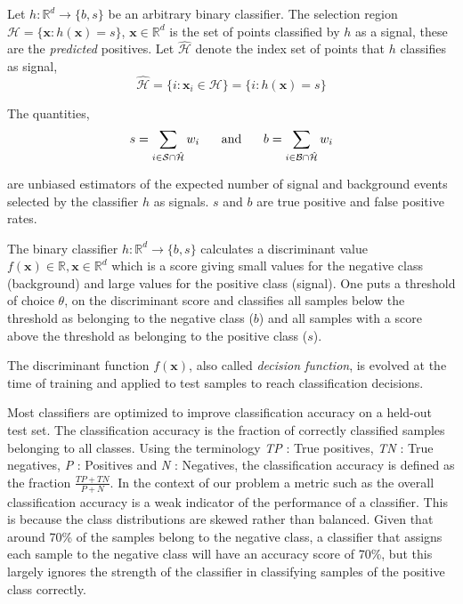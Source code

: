 \documentclass[final,3p,times,twocolumn]{elsarticle}
\begin{document}
Let $ h : \mathbb{R}^{d} \rightarrow \{b,s\} $ be an arbitrary binary classifier. The selection region $\mathcal{H} = \{\textbf{x} : h(\textbf{x}) = s\}$, $\textbf{x} \in \mathbb{R}^{d}$ is the set of points classified by $h$ as a signal, these are the \textit{predicted} positives. Let $\hat{\mathcal{H}}$ denote the index set of points that $h$ classifies as signal, $$ \hat{\mathcal{H}} = \{i : \textbf{x}_{i} \in \mathcal{H}\} = \{i : h(\textbf{x}) = s \}  $$

The quantities, 
\begin{equation} 
s = \sum_{i \in \mathcal{S}\cap \hat{\mathcal{H}}} w_{i} \hspace{5mm}
\textrm{    and    } \hspace{5mm}
b =\sum_{i \in \mathcal{B}\cap\hat{\mathcal{H}}} w_{i} 
\label{unbiased}
\end{equation} 

are unbiased estimators of the expected number of signal and background events selected by the classifier $h$ as signals. $s$ and $b$ are true positive and false positive rates.  

The binary classifier $ h : \mathbb{R}^{d} \rightarrow \{b,s\} $ calculates a discriminant value $f(\textbf{x}) \in \mathbb{R},\textbf{x} \in \mathbb{R}^{d}$ which is a score giving small values for the negative class (background) and large values for the positive class (signal). One puts a threshold of choice $\theta$, on the discriminant score and classifies all samples below the threshold as belonging to the negative class ($b$) and all samples with a score above the threshold as belonging to the positive class ($s$). 

The discriminant function $f(\textbf{x})$, also called \textit{decision function}, is evolved at the time of training and applied to test samples to reach classification decisions.

Most classifiers are optimized to improve classification accuracy on a held-out test set. The classification accuracy is the fraction of correctly classified samples belonging to all classes. Using the terminology \textit{TP} : True positives, \textit{TN} : True negatives, \textit{P} : Positives and \textit{N} : Negatives, the classification accuracy is defined as 
the fraction $\frac{\displaystyle TP + TN}{\displaystyle P + N}$. In the context of our problem a metric such as the overall classification accuracy is a weak indicator of the performance of a classifier. This is because the class distributions are skewed rather than balanced. Given that around 70\% of the samples belong to the negative class, a classifier that assigns each sample to the negative class will have an accuracy score of 70\%, but this largely ignores the strength of the classifier in classifying samples of the positive class correctly. 
\end{document}
